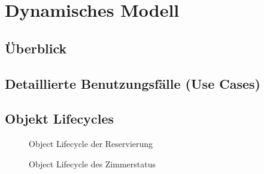 \documentclass[a4paper,12pt,twoside]{scrreprt}
\begin{document}
    \chapter{Dynamisches Modell}
    \section{Überblick}
        
    \section{Detaillierte Benutzungsfälle (Use Cases)}
        

    \newpage
    \section{Objekt Lifecycles}
    \begin{figure}[ht!]
        \begin{center}
            \caption{Object Lifecycle der Reservierung}\label{objectlifecycleReservierung}
        \end{center}
    \end{figure}

    \begin{figure}[ht!]
        \begin{center}
            \caption{Object Lifecycle des Zimmerstatus}\label{objectlifecycleZimmerstatus}
        \end{center}
    \end{figure}
\end{document}

